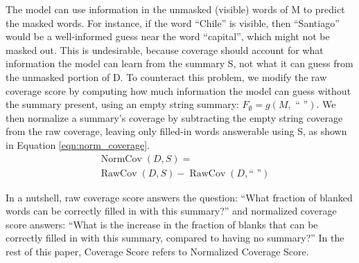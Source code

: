 \documentclass[11pt,a4paper]{article}
\DeclareMathOperator{\RawCov}{RawCov}
\DeclareMathOperator{\NormCov}{NormCov}
\begin{document}
The model can use information in the unmasked (visible) words of M to predict the masked words.  For instance, if the word ``Chile'' is visible, then ``Santiago'' would be a well-informed guess near the word ``capital'', which might not be masked out. This is undesirable, because coverage should account for what information the model can learn from the summary S, not what it can guess from the unmasked portion of D. To counteract this problem, we modify the raw coverage score by computing how much information the model can guess without the summary present, using an empty string summary: $F_\emptyset = g(M, \text{ `` ''})$. We then normalize a summary's coverage by subtracting the empty string coverage from the raw coverage, leaving only filled-in words answerable using S, as shown in Equation \ref{eqn:norm_coverage}.
\begin{equation}
    \begin{aligned}
    &\NormCov(D, S) = \\
    &\RawCov(D, S) - \RawCov(D, \text{`` ''})
    \end{aligned}
    \label{eqn:norm_coverage}
\end{equation}

In a nutshell, raw coverage score answers the question: ``What fraction of blanked words can be correctly filled in with this summary?'' and normalized coverage score answers: ``What is the increase in the fraction of blanks that can be correctly filled in with this summary, compared to having no summary?'' In the rest of this paper, Coverage Score refers to Normalized Coverage Score.
\end{document}
